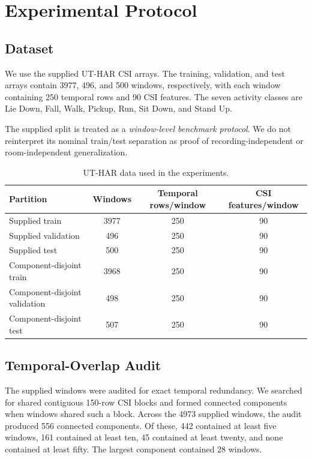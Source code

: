 \documentclass[runningheads]{llncs}
\begin{document}
\section{Experimental Protocol}

\subsection{Dataset}

We use the supplied UT-HAR CSI arrays. The training, validation, and test arrays contain 3977, 496, and 500 windows, respectively, with each window containing 250 temporal rows and 90 CSI features. The seven activity classes are Lie Down, Fall, Walk, Pickup, Run, Sit Down, and Stand Up.

The supplied split is treated as a \emph{window-level benchmark protocol}. We do not reinterpret its nominal train/test separation as proof of recording-independent or room-independent generalization.

\begin{table}[t]
\centering
\caption{UT-HAR data used in the experiments.}
\label{tab:dataset}
\begin{tabular}{lccc}
\toprule
Partition & Windows & Temporal rows/window & CSI features/window\\
\midrule
Supplied train & 3977 & 250 & 90\\
Supplied validation & 496 & 250 & 90\\
Supplied test & 500 & 250 & 90\\
\midrule
Component-disjoint train & 3968 & 250 & 90\\
Component-disjoint validation & 498 & 250 & 90\\
Component-disjoint test & 507 & 250 & 90\\
\bottomrule
\end{tabular}
\end{table}

\subsection{Temporal-Overlap Audit}

The supplied windows were audited for exact temporal redundancy. We searched for shared contiguous 150-row CSI blocks and formed connected components when windows shared such a block. Across the 4973 supplied windows, the audit produced 556 connected components. Of these, 442 contained at least five windows, 161 contained at least ten, 45 contained at least twenty, and none contained at least fifty. The largest component contained 28 windows.
\end{document}
